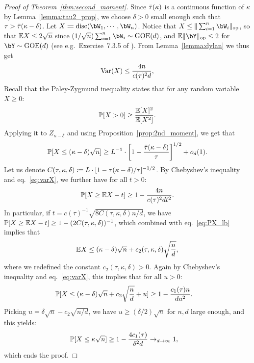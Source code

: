 \begin{proof}[Proof of Theorem~\ref{thm:second_moment}]
\myskip 
    Since ${\bar{\tau}}(\kappa)$ is a continuous function of $\kappa$ by Lemma~\ref{lemma:tau2_prop}, we choose $\delta > 0$ small enough such 
    that $\tau > {\bar{\tau}}(\kappa-\delta)$.
    Let $X \coloneqq \disc(\bW_1, \cdots, \bW_n)$.
    Notice that $X \leq \|\sum_{i=1}^n \bW_i\|_\op$, 
    so that $\mathbb{E} X \leq 2 \sqrt{n}$ since $(1/\sqrt{n})\sum_{i=1}^n \bW_i \sim \GOE(d)$, 
    and $\EE \|\bY\|_\op \leq 2$ for $\bY \sim \GOE(d)$ (see e.g.\ Exercise~7.3.5 of \cite{vershynin2018high}).
    From Lemma~\ref{lemma:dylan} we thus get 
    \begin{align}\label{eq:varX}
        \mathrm{Var}(X) \leq \frac{4n}{c(\tau)^2 d},
    \end{align}
    Recall that the Paley-Zygmund inequality states that for any random variable $X \geq 0$:
    \begin{align*}
        \mathbb{P}[X > 0] \geq \frac{\mathbb{E}[X]^2}{\mathbb{E}[X^2]}.
    \end{align*} 
    Applying it to $Z_{\kappa - \delta}$ and using Proposition~\ref{prop:2nd_moment}, we get that 
    \begin{equation}\label{eq:PX_lb}
        \mathbb{P}[X \leq (\kappa-\delta) \sqrt{n}] \geq L^{-1} \cdot \left[1 - \frac{{\bar{\tau}}(\kappa-\delta)}{\tau}\right]^{1/2} + o_d(1).
    \end{equation}
    Let us denote $C(\tau,\kappa,\delta) \coloneqq L \cdot [1 - {\bar{\tau}}(\kappa-\delta)/\tau]^{-1/2}$.
    By Chebyshev's inequality and eq.~\eqref{eq:varX}, we further have for all $t > 0$:
    \begin{align*}
        \mathbb{P}[X \geq \mathbb{E} X - t] \geq 1 - \frac{4n}{c(\tau)^2 d t^2}.
    \end{align*}
    In particular, if $t = c(\tau)^{-1} \sqrt{8 C(\tau, \kappa, \delta) n / d}$, we have $\mathbb{P}[X \geq \mathbb{E} X - t] \geq 1 - (2C(\tau,\kappa,\delta))^{-1}$, which combined 
    with eq.~\eqref{eq:PX_lb} implies that  
    \begin{equation*}
        \mathbb{E} X \leq (\kappa-\delta) \sqrt{n} + c_2(\tau,\kappa,\delta) \sqrt{\frac{n}{d}}, 
    \end{equation*}
    where we redefined the constant $c_2(\tau,\kappa,\delta) > 0$.
    Again by Chebyshev's inequality and eq.~\eqref{eq:varX}, this implies that for all $u > 0$:
    \begin{align*}
        \mathbb{P}[X \leq (\kappa-\delta) \sqrt{n} + c_2 \sqrt{\frac{n}{d}} + u] &\geq 1 - \frac{c_1(\tau) n}{d u^2}.
    \end{align*}
    Picking $u = \delta \sqrt{n} - c_2 \sqrt{n/d}$, we have $u \geq (\delta/2) \sqrt{n}$ for $n,d$ large enough, and this yields:
    \begin{align*}
        \mathbb{P}[X \leq \kappa \sqrt{n}] &\geq 1 - \frac{4 c_1(\tau)}{\delta^2 d} \to_{d \to \infty} 1,
    \end{align*}
    which ends the proof.
\end{proof}

